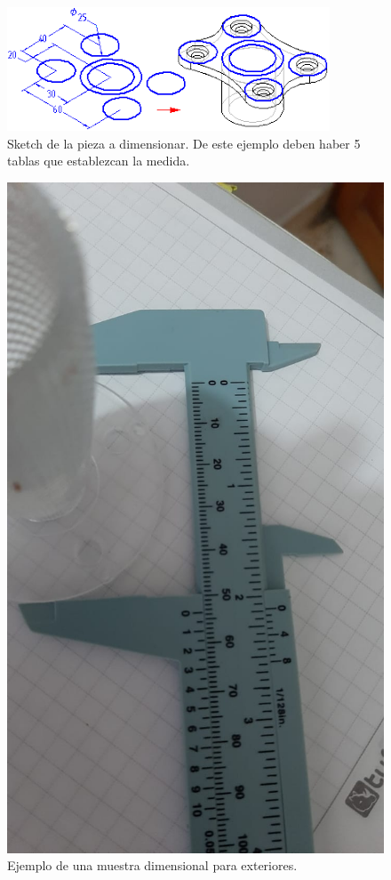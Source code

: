 \documentclass[letterpaper,pdftex]{article}
\begin{document}
\begin{figure}
\begin{center}
\includegraphics[scale=0.7]{sketch.png}
\caption{Sketch de la pieza a dimensionar. De este ejemplo deben haber 5 tablas que establezcan la medida.}
\label{fig:sketch}
\end{center}
\end{figure}

\begin{figure}
\begin{center}
\includegraphics[scale=0.2]{medida}
\caption{Ejemplo de una muestra dimensional para exteriores.}
\label{fig:medida}
\end{center}
\end{figure}


\end{document}
